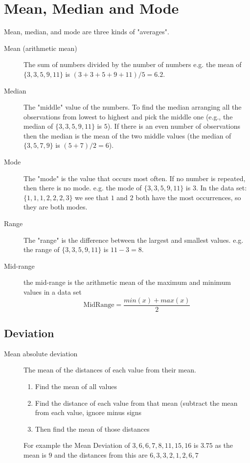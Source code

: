 \section{Mean, Median and Mode}
Mean, median, and mode are three kinds of "averages".
\begin{description}
\item [Mean (arithmetic mean)] The sum of numbers divided by the number of numbers e.g. the mean of $\{3, 3, 5, 9, 11\}$ is $(3 + 3 + 5 + 9 + 11)/5 = 6.2$.
\item [Median] The "middle" value of the numbers. To find the median arranging all the observations from lowest to highest and pick the middle one (e.g., the median of $\{3, 3, 5, 9, 11\}$ is $5$). If there is an even number of observations then the median is the mean of the two middle values (the median of $\{3, 5, 7, 9\}$ is $(5 + 7) / 2 = 6$).
\item [Mode] The "mode" is the value that occurs most often. If no number is repeated, then there is no mode. e.g. the mode of $\{3, 3, 5, 9, 11\}$ is $3$. In the data set:
$\{1, 1, 1, 2, 2, 2, 3\}$ we see that $1$ and $2$ both have the most occurrences, so they are both modes.
\item [Range] The "range" is the difference between the largest and smallest values. e.g. the range of $\{3, 3, 5, 9, 11\}$ is $11-3=8$.
\item [Mid-range] the mid-range is the arithmetic mean of the maximum and minimum values in a data set
\[
\textrm{MidRange} = \frac{min(x) + max(x)}{2}
\]
\end{description}

\subsection{Deviation}
\begin{description}
    \item [Mean absolute deviation] The mean of the distances of each value from their mean.
\begin{enumerate}
    \item Find the mean of all values
    \item Find the distance of each value from that mean (subtract the mean from each value, ignore minus signs
    \item Then find the mean of those distances
\end{enumerate} For example the Mean Deviation of $3, 6, 6, 7, 8, 11, 15, 16$ is $3.75$ as the mean is $9$ and the distances from this are $6, 3, 3, 2, 1, 2, 6, 7$

\end{description}

